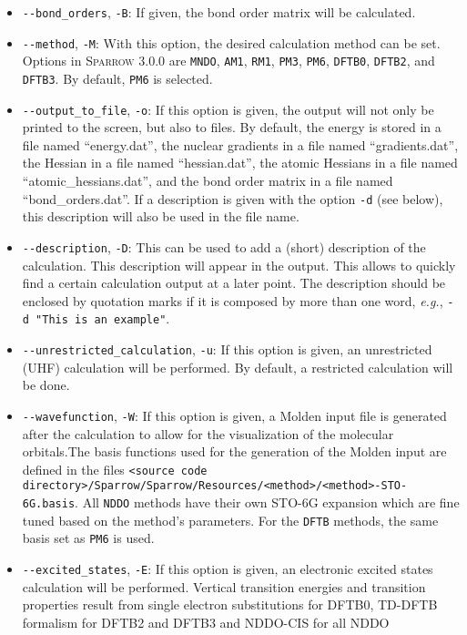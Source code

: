 \documentclass[]{tufte-book}
\begin{document}
\begin{itemize}
\item \texttt{-{}-bond\_orders}, \texttt{-B}: If given, the bond order matrix will be calculated.
\item \texttt{-{}-method}, \texttt{-M}: With this option, the desired calculation method can be set. Options in
\textsc{Sparrow} 3.0.0 are \texttt{MNDO}, \texttt{AM1}, \texttt{RM1}, \texttt{PM3}, \texttt{PM6}, \texttt{DFTB0}, \texttt{DFTB2}, and
\texttt{DFTB3}. By default, \texttt{PM6} is selected.
\item \texttt{-{}-output\_to\_file}, \texttt{-o}: If this option is given, the output will not only be printed to the screen, 
but also to files. By default, the energy is stored in a file named ``energy.dat'', the nuclear gradients in a file named
``gradients.dat'', the Hessian in a file named ``hessian.dat'', the atomic Hessians in a file named ``atomic\_hessians.dat'', and the
bond order matrix in a file named ``bond\_orders.dat''.
If a description is given with the option \texttt{-d} (see below), this description will also be used in the file name.
\item \texttt{-{}-description}, \texttt{-D}: This can be used to add a (short) description of the calculation. This
description will appear in the output. This allows to quickly find a certain calculation output at a later point. The
description should be enclosed by quotation marks if it is composed by more than one word, \textit{e.g.},
\texttt{-d "This is an example"}.
\item \texttt{-{}-unrestricted\_calculation}, \texttt{-u}: If this option is given, an unrestricted (UHF) calculation
will be performed. By default, a restricted calculation will be done.
\item \texttt{-{}-wavefunction}, \texttt{-W}: If this option is given, a Molden input file is generated after the
calculation to allow for the visualization of the molecular orbitals.The basis functions used for the generation of the
Molden input are defined in the files \texttt{<source code directory>/Sparrow/Sparrow/Resources/<method>/<method>-STO-6G.basis}.
All \texttt{NDDO} methods have their own STO-6G expansion which are fine tuned based on the method's parameters.
For the \texttt{DFTB} methods, the same basis set as \texttt{PM6} is used.
\item \texttt{-{}-excited\_states}, \texttt{-E}: If this option is given, an
  electronic excited states calculation will be performed. Vertical transition
    energies and transition properties result from single electron substitutions
    for DFTB0, TD-DFTB formalism for DFTB2 and DFTB3 and NDDO-CIS for all NDDO

\end{itemize}
\end{document}
